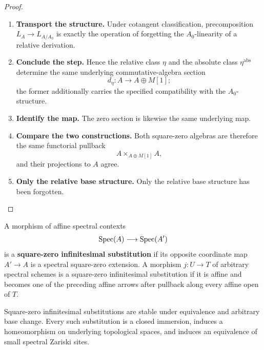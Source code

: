 \begin{proof}
\leavevmode
\begin{enumerate}[label=\textup{(\arabic*)}]
    \item \textbf{Transport the structure.}
    Under cotangent classification, precomposition \(L_A\to L_{A/A_0}\) is exactly the operation of
    forgetting the \(A_0\)-linearity of a relative derivation.

    \item \textbf{Conclude the step.}
    Hence the relative class \(\eta\) and the absolute class \(\eta^{\mathrm{abs}}\) determine the same
    underlying commutative-algebra section
    \[
        d_\eta:A\longrightarrow A\oplus M[1];
    \]
    the former additionally carries the specified compatibility with the \(A_0\)-structure.

    \item \textbf{Identify the map.}
    The zero section is likewise the same underlying map.

    \item \textbf{Compare the two constructions.}
    Both square-zero algebras are therefore the same functorial pullback
    \[
        A\times_{A\oplus M[1]}A,
    \]
    and their projections to \(A\) agree.

    \item \textbf{Only the relative base structure.}
    Only the relative base structure has been forgotten.
\end{enumerate}
\end{proof}

\begin{definition}
\label{def:spectral-square-zero-substitution}
A morphism of affine spectral contexts
\[
    \operatorname{Spec}(A)\longrightarrow\operatorname{Spec}(A')
\]
is a \textbf{square-zero infinitesimal substitution} if its opposite coordinate
map \(A'\to A\) is a spectral square-zero extension. A morphism
\(j:U\to T\) of arbitrary spectral schemes is a square-zero infinitesimal
substitution if it is affine and becomes one of the preceding affine arrows
after pullback along every affine open of \(T\).
\end{definition}

\begin{proposition}
\label{prop:square-zero-substitution-permanence}
Square-zero infinitesimal substitutions are stable under equivalence and
arbitrary base change. Every such substitution is a closed immersion, induces
a homeomorphism on underlying topological spaces, and induces an equivalence
of small spectral Zariski sites.
\end{proposition}

